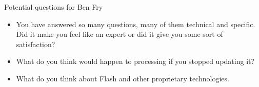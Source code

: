 Potential questions for Ben Fry
\begin{itemize}
    \item You have answered so many questions, many of them technical and specific. Did it make you feel like an expert or did it give you some sort of satisfaction?
    \item What do you think would happen to processing if you stopped updating it?
    \item What do you think about Flash and other proprietary technologies.
\end{itemize}